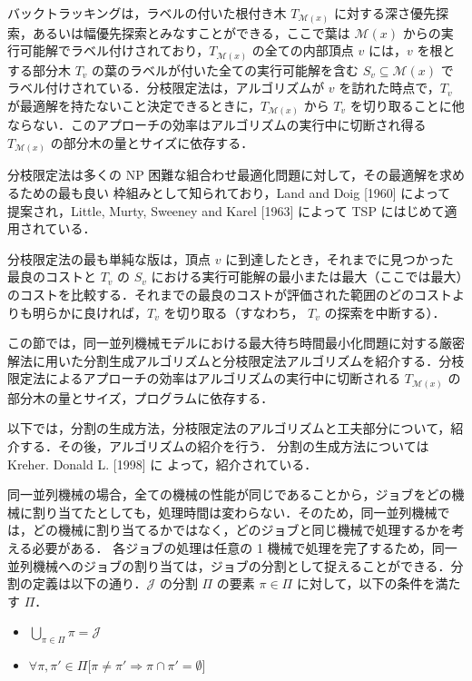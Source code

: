 \documentclass[12pt]{optlab-bachelor}
\begin{document}
バックトラッキングは，ラベルの付いた根付き木 $T_{\mathcal{M}(x)}$ に対する深さ優先探索，あるいは幅優先探索とみなすことができる，ここで葉は $\mathcal{M}(x)$ からの実行可能解でラベル付けされており，$T_{\mathcal{M}(x)}$ の全ての内部頂点 $v$ には，$v$ を根とする部分木 $T_v$ の葉のラベルが付いた全ての実行可能解を含む $S_v \subseteq \mathcal{M}(x)$ でラベル付けされている．分枝限定法は，アルゴリズムが $v$ を訪れた時点で，$T_v$ が最適解を持たないこと決定できるときに，$T_{\mathcal{M}(x)}$ から $T_v$ を切り取ることに他ならない．このアプローチの効率はアルゴリズムの実行中に切断され得る $T_{\mathcal{M}(x)}$ の部分木の量とサイズに依存する．

分枝限定法は多くの NP 困難な組合わせ最適化問題に対して，その最適解を求めるための最も良い
枠組みとして知られており，Land and Doig [1960] \cite{BandB} によって
提案され，Little, Murty, Sweeney and Karel [1963] \cite{BandB2}
によって TSP にはじめて適用されている．

分枝限定法の最も単純な版は，頂点 $v$ に到達したとき，それまでに見つかった最良のコストと $T_v$
の $S_v$ における実行可能解の最小または最大（ここでは最大）のコストを比較する．それまでの最良のコストが評価された範囲のどのコストよりも明らかに良ければ，$T_v$ を切り取る（すなわち， $T_v$ の探索を中断する）．


この節では，同一並列機械モデルにおける最大待ち時間最小化問題に対する厳密解法に用いた分割生成アルゴリズムと分枝限定法アルゴリズムを紹介する．分枝限定法によるアプローチの効率はアルゴリズムの実行中に切断される $T_{\mathcal{M}(x)}$ の部分木の量とサイズ，プログラムに依存する．%

以下では，分割の生成方法，分枝限定法のアルゴリズムと工夫部分について，紹介する．その後，アルゴリズムの紹介を行う．
分割の生成方法については Kreher. Donald L. [1998] \cite{rgf} に
よって，紹介されている．

同一並列機械の場合，全ての機械の性能が同じであることから，ジョブをどの機械に割り当てたとしても，処理時間は変わらない．そのため，同一並列機械では，どの機械に割り当てるかではなく，どのジョブと同じ機械で処理するかを考える必要がある．
各ジョブの処理は任意の 1 機械で処理を完了するため，同一並列機械へのジョブの割り当ては，ジョブの分割として捉えることができる．分割の定義は以下の通り．$\mathcal{J}$ の分割 $\Pi$ の要素 $\pi \in \Pi$ に対して，以下の条件を満たす $\Pi$．
\begin{itemize}
  \item $\displaystyle \bigcup_{\pi \in \Pi}\pi = \mathcal{J} $
  \item $\forall \pi, \pi' \in \Pi \big[\pi \neq \pi' \Rightarrow \pi \cap \pi' = \emptyset \big]$
\end{itemize}
\end{document}
